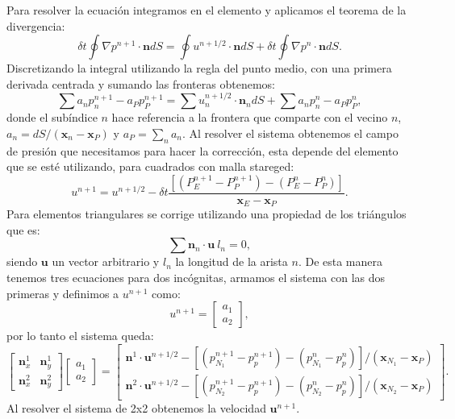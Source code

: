 \documentclass[a4paper,10pt, oneside]{book}
\begin{document}
Para resolver la ecuación integramos en el elemento y aplicamos el teorema de la divergencia:
\begin{equation}
	\delta t \oint \nabla p^{n+1} \cdot \mathbf{n} dS = \oint u^{n+1/2} \cdot \mathbf{n} dS + \delta t  \oint \nabla p^n \cdot \mathbf{n} dS . \nonumber
\end{equation}
Discretizando la integral utilizando la regla del punto medio, con una primera derivada centrada y sumando las fronteras obtenemos:
\begin{equation}
	\sum a_n p^{n+1}_n - a_P p^{n+1}_P = \sum u^{n+1/2}_n \cdot \mathbf{n}_n dS + \sum a_n p^{n}_n - a_P p^{n}_P, \nonumber
\end{equation}
donde el subíndice $n$ hace referencia a la frontera que comparte con el vecino $n$, $a_n = dS / (\mathbf{x}_n - \mathbf{x}_P)$ y $a_P = \sum_n a_n$. Al resolver el sistema obtenemos el campo de presión que necesitamos para hacer la corrección, esta depende del elemento que se esté utilizando, para cuadrados con malla stareged:
\begin{equation}
	u^{n+1} = u^{n+1/2} - \delta t \frac{[(P^{n+1}_E - P^{n+1}_P) - (P^n_E - P^n_P)]}{ \mathbf{x}_E - \mathbf{x}_P}. \nonumber
\end{equation}
Para elementos triangulares se corrige utilizando una propiedad de los triángulos que es:
\begin{equation}
	\sum \mathbf{n}_n \cdot \mathbf{u} ~ l_n= 0, \nonumber 
\end{equation}
siendo $\mathbf{u}$ un vector arbitrario y $l_n$ la longitud de la arista $n$. De esta manera tenemos tres ecuaciones para dos incógnitas, armamos el sistema con las dos primeras y definimos a $u^{n+1}$ como:
\begin{equation}
	u^{n+1} = 
	\begin{bmatrix}
		a_1 \\
		a_2	
	\end{bmatrix},
\end{equation}
por lo tanto el sistema queda:
\begin{equation}
	\begin{bmatrix}
		\mathbf{n}_x^1 & \mathbf{n}_y^1 \\
		\mathbf{n}_x^2 & \mathbf{n}_y^2
	\end{bmatrix}
	\begin{bmatrix}
		a_1 \\
		a_2
	\end{bmatrix}
	=
	\begin{bmatrix}
		\mathbf{n}^1 \cdot \mathbf{u}^{n + 1/2} - [(p^{n+1}_{N_1} - p^{n+1}_p) - (p^n_{N_1} - p^n_p)] /( \mathbf{x}_{N_1} -  \mathbf{x}_P) \\
		\mathbf{n}^2 \cdot \mathbf{u}^{n + 1/2} - [(p^{n+1}_{N_2} - p^{n+1}_p) - (p^n_{N_2} - p^n_p)] /( \mathbf{x}_{N_2} -  \mathbf{x}_P)
	\end{bmatrix}. \nonumber
\end{equation}
Al resolver el sistema de 2x2 obtenemos la velocidad $\mathbf{u}^{n+1}$.
\end{document}
